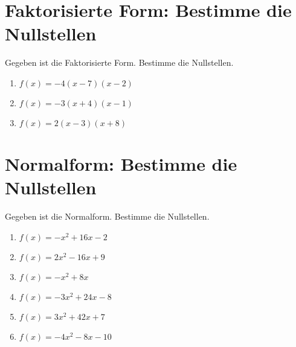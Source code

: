 \documentclass{article}%
\begin{document}
%
\section{Faktorisierte Form: Bestimme die Nullstellen}%
\label{sec:FaktorisierteFormBestimmedieNullstellen}%
Gegeben ist die Faktorisierte Form. Bestimme die Nullstellen.%
\begin{enumerate}[label=\alph*)]%
\item%
\newline\vspace{0.5cm} $f(x)=-4(x-7)(x-2)$%
\item%
\newline\vspace{0.5cm} $f(x)=-3(x+4)(x-1)$%
\item%
\newline\vspace{0.5cm} $f(x)=2(x-3)(x+8)$%
\end{enumerate}

%
\section{Normalform: Bestimme die Nullstellen}%
\label{sec:NormalformBestimmedieNullstellen}%
Gegeben ist die Normalform. Bestimme die Nullstellen.%
\begin{enumerate}[label=\alph*)]%
\item%
\newline\vspace{0.5cm} $f(x)=-x^2 + 16x - 2$%
\item%
\newline\vspace{0.5cm} $f(x)=2x^2 - 16x + 9$%
\item%
\newline\vspace{0.5cm} $f(x)=-x^2 + 8x$%
\item%
\newline\vspace{0.5cm} $f(x)=-3x^2 + 24x - 8$%
\item%
\newline\vspace{0.5cm} $f(x)=3x^2 + 42x + 7$%
\item%
\newline\vspace{0.5cm} $f(x)=-4x^2 - 8x - 10$%
\end{enumerate}

%
\end{document}
